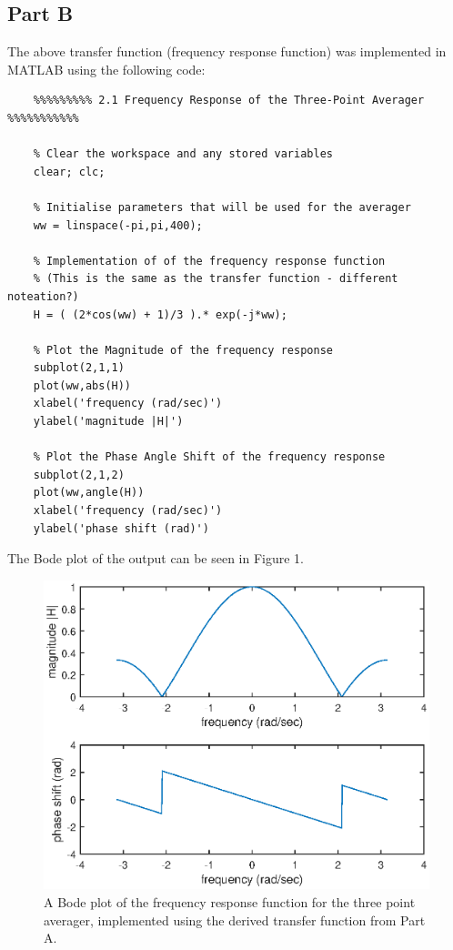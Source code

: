 \documentclass{article}
\begin{document}
\subsection{Part B}

The above transfer function (frequency response function) was implemented in MATLAB using the following code:

\begin{lstlisting}
	%%%%%%%%% 2.1 Frequency Response of the Three-Point Averager %%%%%%%%%%%
	
	% Clear the workspace and any stored variables
	clear; clc;
	
	% Initialise parameters that will be used for the averager
	ww = linspace(-pi,pi,400);
	
	% Implementation of of the frequency response function
	% (This is the same as the transfer function - different noteation?)
	H = ( (2*cos(ww) + 1)/3 ).* exp(-j*ww);
	
	% Plot the Magnitude of the frequency response
	subplot(2,1,1)
	plot(ww,abs(H))
	xlabel('frequency (rad/sec)')
	ylabel('magnitude |H|')
	
	% Plot the Phase Angle Shift of the frequency response
	subplot(2,1,2)
	plot(ww,angle(H))
	xlabel('frequency (rad/sec)')
	ylabel('phase shift (rad)')
\end{lstlisting}

The Bode plot of the output can be seen in Figure 1.

\begin{figure}[h]
	\centering
	\includegraphics[scale=0.4]{fig1}
	\caption{A Bode plot of the frequency response function for the three point averager, implemented using the derived transfer function from Part A.}
\end{figure}
\end{document}
